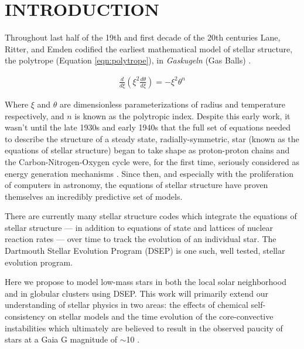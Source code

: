 \section{INTRODUCTION}
Throughout last half of the 19th and first decade of the 20th centuries Lane,
Ritter, and Emden codified the earliest mathematical model of stellar
structure, the polytrope (Equation \ref{eqn:polytrope}), in \textit{Gaskugeln}
(Gas Balls) \citep{Emden1907}.

\begin{align}\label{eqn:polytrope}
	\frac{d}{d\xi}\left(\xi^{2}\frac{d\theta}{d\xi}\right) = -\xi^{2}\theta^{n}
\end{align}

Where $\xi$ and $\theta$ are dimensionless parameterizations of radius and
temperature respectively, and $n$ is known as the polytropic index. Despite this
early work, it wasn't until the late 1930s and early 1940s that the full set of
equations needed to describe the structure of a steady state,
radially-symmetric, star (known as the equations of stellar structure) began to
take shape as proton-proton chains and the Carbon-Nitrogen-Oxygen cycle were,
for the first time, seriously considered as energy generation mechanisms
\citep{Cowling1966}. Since then, and especially with the proliferation of
computers in astronomy, the equations of stellar structure have proven
themselves an incredibly predictive set of models.  

There are currently many stellar structure codes \citep[e.g.][]{Dotter2008,
Kovetz2009, Paxton2011} which integrate the equations of stellar structure ---
in addition to equations of state and lattices of nuclear reaction rates ---
over time to track the evolution of an individual star. The Dartmouth Stellar
Evolution Program (DSEP) \citep{Chaboyer2001, Bjork2006, Dotter2008} is one
such, well tested, stellar evolution program.

Here we propose to model low-mass stars in both the local solar neighborhood
and in globular clusters using DSEP. This work will primarily extend our
understanding of stellar physics in two areas: the effects of chemical
self-consistency on stellar models \citep[e.g.][]{Dotter2014} and the time
evolution of the core-convective instabilities which ultimately are believed to
result in the observed paucity of stars at a Gaia G magnitude of $\sim$10
\citep{Jao2018, Feiden2020}. 


